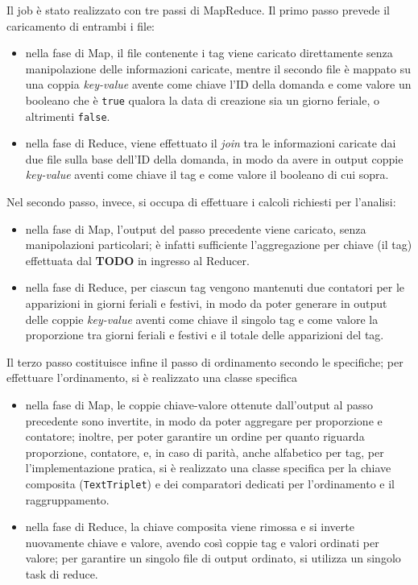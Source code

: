   Il job è stato realizzato con tre passi di MapReduce.
  Il primo passo prevede il caricamento di entrambi i file:
  \begin{itemize}
    \item
      nella fase di Map, il file contenente i tag viene caricato direttamente senza manipolazione delle informazioni caricate,
      mentre il secondo file è mappato su una coppia \textit{key-value} avente come chiave l'ID della domanda
      e come valore un booleano che è \texttt{true} qualora la data di creazione sia un giorno feriale, o altrimenti \texttt{false}.
    \item
      nella fase di Reduce, viene effettuato il \textit{join} tra le informazioni caricate dai due file sulla base dell'ID della domanda,
      in modo da avere in output coppie \textit{key-value} aventi come chiave il tag e come valore il booleano di cui sopra.
  \end{itemize}

  Nel secondo passo, invece, si occupa di effettuare i calcoli richiesti per l'analisi:
  \begin{itemize}
    \item
      nella fase di Map, l'output del passo precedente viene caricato, senza manipolazioni particolari;
      è infatti sufficiente l'aggregazione per chiave (il tag) effettuata dal \textbf{TODO} in ingresso al Reducer.

    \item
      nella fase di Reduce, per ciascun tag vengono mantenuti due contatori per le apparizioni in giorni feriali e festivi,
      in modo da poter generare in output delle coppie \textit{key-value} aventi come chiave il singolo tag e come valore la proporzione tra giorni feriali e festivi e il totale delle apparizioni del tag.
  \end{itemize}

  Il terzo passo costituisce infine il passo di ordinamento secondo le specifiche; per effettuare l'ordinamento, si è realizzato una classe specifica
  \begin{itemize}
    \item
      nella fase di Map, le coppie chiave-valore ottenute dall'output al passo precedente sono invertite, in modo da poter aggregare per proporzione e contatore;
      inoltre, per poter garantire un ordine per quanto riguarda proporzione, contatore, e, in caso di parità, anche alfabetico per tag,
      per l'implementazione pratica, si è realizzato una classe specifica per la chiave composita (\texttt{TextTriplet}) e dei comparatori dedicati per l'ordinamento e il raggruppamento.

    \item
      nella fase di Reduce, la chiave composita viene rimossa e si inverte nuovamente chiave e valore, avendo così coppie tag e valori ordinati per valore;
      per garantire un singolo file di output ordinato, si utilizza un singolo task di reduce.
  \end{itemize}

